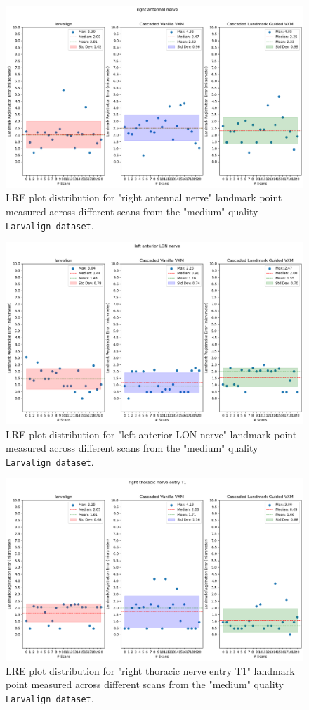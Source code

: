 	\begin{figure}[h!]
		\centering
		\includegraphics[width=0.75\columnwidth]{resources/chapter5_fresh/output/right antennal nerve.png}
		\caption{LRE plot distribution for "right antennal nerve" landmark point measured across different scans from the "medium" quality \texttt{Larvalign dataset}.}
		\label{fig:landmark9}
	\end{figure}

	\begin{figure}[h!]
		\centering
		\includegraphics[width=0.75\columnwidth]{resources/chapter5_fresh/output/left anterior LON nerve.png}
		\caption{LRE plot distribution for "left anterior LON nerve" landmark point measured across different scans from the "medium" quality \texttt{Larvalign dataset}.}
		\label{fig:landmark10}
	\end{figure}

	\begin{figure}[h!]
		\centering
		\includegraphics[width=0.75\columnwidth]{resources/chapter5_fresh/output/right thoracic nerve entry T1.png}
		\caption{LRE plot distribution for "right thoracic nerve entry T1" landmark point measured across different scans from the "medium" quality \texttt{Larvalign dataset}.}
		\label{fig:landmark11}
	\end{figure}

